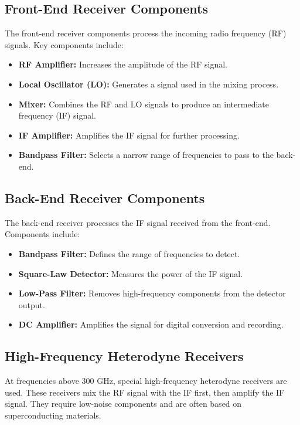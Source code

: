 \subsection{Front-End Receiver Components}

The front-end receiver components process the incoming radio frequency (RF) signals. Key components include:

\begin{itemize}
    \item \textbf{RF Amplifier:} Increases the amplitude of the RF signal.
    \item \textbf{Local Oscillator (LO):} Generates a signal used in the mixing process.
    \item \textbf{Mixer:} Combines the RF and LO signals to produce an intermediate frequency (IF) signal.
    \item \textbf{IF Amplifier:} Amplifies the IF signal for further processing.
    \item \textbf{Bandpass Filter:} Selects a narrow range of frequencies to pass to the back-end.
\end{itemize}

\subsection{Back-End Receiver Components}

The back-end receiver processes the IF signal received from the front-end. Components include:

\begin{itemize}
    \item \textbf{Bandpass Filter:} Defines the range of frequencies to detect.
    \item \textbf{Square-Law Detector:} Measures the power of the IF signal.
    \item \textbf{Low-Pass Filter:} Removes high-frequency components from the detector output.
    \item \textbf{DC Amplifier:} Amplifies the signal for digital conversion and recording.
\end{itemize}

\subsection{High-Frequency Heterodyne Receivers}

At frequencies above 300 GHz, special high-frequency heterodyne receivers are used. These receivers mix the RF signal with the IF first, then amplify the IF signal. They require low-noise components and are often based on superconducting materials.